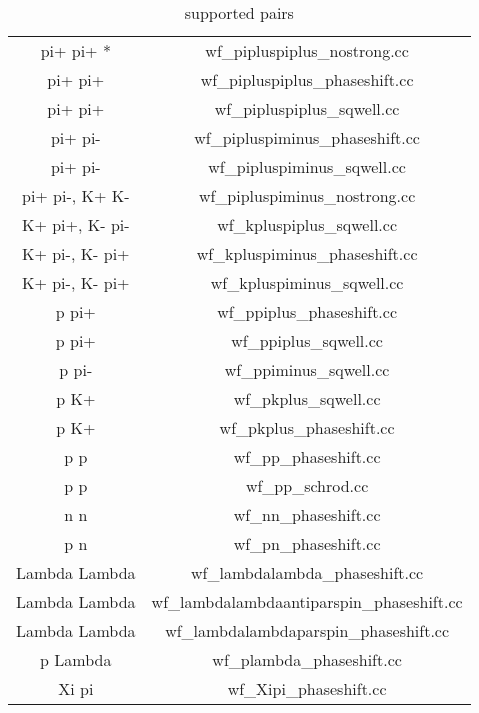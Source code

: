 \documentclass[10pt]{article}
\begin{document}
\begin{table}
\caption{supported pairs}
\begin{center}
\begin{tabular}{|c|c|} 
pi+ pi+ *			& wf\_pipluspiplus\_nostrong.cc               \\
pi+ pi+ 			& wf\_pipluspiplus\_phaseshift.cc             \\
pi+ pi+ 			& wf\_pipluspiplus\_sqwell.cc              \\   
pi+ pi- 			& wf\_pipluspiminus\_phaseshift.cc            \\
pi+ pi- 			& wf\_pipluspiminus\_sqwell.cc                \\
pi+ pi-, K+ K- 		& wf\_pipluspiminus\_nostrong.cc             \\
K+ pi+, K- pi-		& wf\_kpluspiplus\_sqwell.cc                  \\
K+ pi-, K- pi+		& wf\_kpluspiminus\_phaseshift.cc            \\ 
K+ pi-, K- pi+ 		& wf\_kpluspiminus\_sqwell.cc                 \\
p pi+ 			& wf\_ppiplus\_phaseshift.cc\\
p pi+ 			& wf\_ppiplus\_sqwell.cc\\
p pi- 				& wf\_ppiminus\_sqwell.cc\\
p K+  			& wf\_pkplus\_sqwell.cc\\
p K+ 			& wf\_pkplus\_phaseshift.cc\\
p p 				& wf\_pp\_phaseshift.cc\\
p p 				& wf\_pp\_schrod.cc\\
n n 				& wf\_nn\_phaseshift.cc            \\           
p n  				& wf\_pn\_phaseshift.cc\\
Lambda Lambda 	& wf\_lambdalambda\_phaseshift.cc             \\
Lambda Lambda 	& wf\_lambdalambdaantiparspin\_phaseshift.cc \\ 
Lambda Lambda 	& wf\_lambdalambdaparspin\_phaseshift.cc     \\ 
p Lambda			& wf\_plambda\_phaseshift.cc\\
Xi pi				& wf\_Xipi\_phaseshift.cc           
\end{tabular}
\end{center}
\label{supported pairs * pi+ pi+ wave function and kernels are used for all identical meson pairs (e.g. K+ K+, pi- pi-, ...); pi0 pi0 correlations are essentially pure Bise-Einstein, so are analytic as are pi+ pi+ or pi- pi- when ignoring Coulomb repulsion.}
\end{table}%
\end{document}
